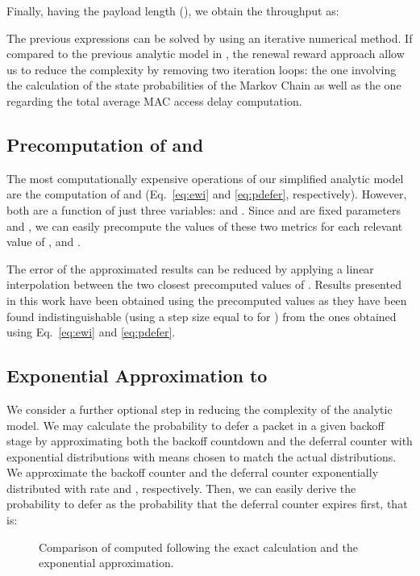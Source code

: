 \documentclass[preprint,12pt]{elsarticle}
\begin{document}
Finally, having the payload length (), we obtain the throughput as:



The previous expressions can be solved by using an iterative numerical method. If compared to the previous analytic model in \cite{chung2006performance}, the renewal reward approach allow us to reduce the complexity by removing two iteration loops: the one involving the calculation of the state probabilities of the Markov Chain as well as the one regarding the total average MAC access delay computation.

\subsection{Precomputation of  and }



The most computationally expensive operations of our simplified analytic model are the computation of  and  (Eq.~\ref{eq:ewi} and \ref{eq:pdefer}, respectively). However, both are a function of just three variables:  and . Since  and  are fixed parameters and , we can easily precompute the values of these two metrics for each relevant value of ,  and .

The error of the approximated results can be reduced by applying a linear interpolation between the two closest precomputed values of . Results presented in this work have been obtained using the precomputed values as they have been found indistinguishable (using a step size equal to  for ) from the ones obtained using Eq.~\ref{eq:ewi} and \ref{eq:pdefer}. 

\subsection{Exponential Approximation to }

We consider a further optional step in reducing the complexity of the analytic model. We may calculate the probability to defer a packet in a given backoff stage by approximating both the backoff countdown and the deferral counter with exponential distributions with means chosen to match the actual distributions. We approximate the backoff counter and the deferral counter exponentially distributed with rate  and , respectively. Then, we can easily derive the probability to defer as the probability that the deferral counter expires first, that is:



\begin{figure}[t!!!!!]
\centering
{}
\caption{Comparison of  computed following the exact calculation and the exponential approximation.}
\label{fig:exp_approx_comp}
\end{figure}
\end{document}
